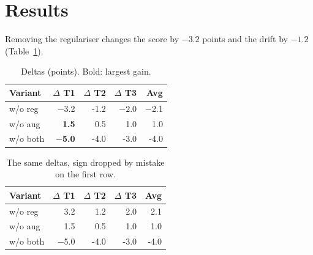 \documentclass{article}
\begin{document}
\section{Results}
Removing the regulariser changes the score by $-3.2$ points and the drift by $-1.2$ (Table~\ref{tab:a}).
\begin{table}[h]\centering\caption{Deltas (points). Bold: largest gain.}\label{tab:a}
\begin{tabular}{lrrrr}
\toprule
Variant & $\Delta$ T1 & $\Delta$ T2 & $\Delta$ T3 & Avg \\
\midrule
w/o reg & $-$3.2 & -1.2 & $-2.0$ & $-$2.1 \\
w/o aug & \textbf{1.5} & 0.5 & 1.0 & 1.0 \\
w/o both & \textbf{$-$5.0} & -4.0 & -3.0 & -4.0 \\
\bottomrule
\end{tabular}\end{table}
\begin{table}[h]\centering\caption{The same deltas, sign dropped by mistake on the first row.}\label{tab:b}
\begin{tabular}{lrrrr}
\toprule
Variant & $\Delta$ T1 & $\Delta$ T2 & $\Delta$ T3 & Avg \\
\midrule
w/o reg & 3.2 & 1.2 & 2.0 & 2.1 \\
w/o aug & 1.5 & 0.5 & 1.0 & 1.0 \\
w/o both & $-$5.0 & -4.0 & -3.0 & -4.0 \\
\bottomrule
\end{tabular}\end{table}
\end{document}
